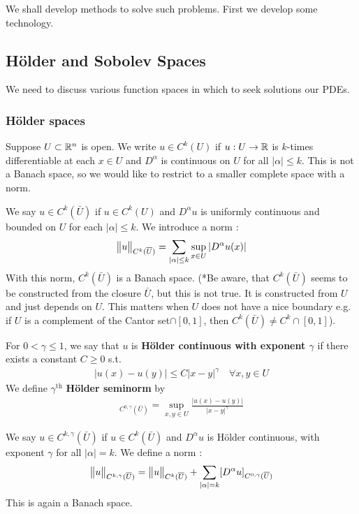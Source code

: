 \documentclass[12pt,a4paper]{report}
\begin{document}
We shall develop methods to solve such problems. First we develop some technology.

\subsection*{H\"{o}lder and Sobolev Spaces}

We need to discuss various function spaces in which to seek solutions our PDEs.

\subsubsection*{H\"{o}lder spaces}

Suppose $U\subset \mathbb{R}^n$ is open. We write $u\in C^k(U)$ if $u:U\rightarrow \mathbb{R}$ is $k$-times differentiable at each $x\in U$ and $D^{\alpha}$ is continuous on $U$ for all $|\alpha| \leq k$. This is not a Banach space, so we would like to restrict to a smaller complete space with a norm.

\quad We say $u\in C^k(\bar{U})$ if $u\in C^k (U)$ and $D^{\alpha}u$ is uniformly continuous and bounded on $U$ for each $|\alpha| \leq k$. We introduce a norm :
\begin{align*}
\bigl\lVert u\bigr\rVert_{C^k(\overline{U})} = \sum_{|\alpha|\leq k} \sup_{x\in U} |D^{\alpha}u(x)|
\end{align*}
With this norm, $C^k(\bar{U})$ is a Banach space. (*Be aware, that $C^k(\bar{U})$ seems to be constructed from the closure $\bar{U}$, but this is not true. It is constructed from $U$ and just depends on $U$. This matters when $U$ does not have a nice boundary e.g. if $U$ is a complement of the Cantor set$\cap [0,1]$, then $C^{k}(\bar{U})\neq C^{k} \cap [0,1]$).

\quad For $0< \gamma \leq 1$, we say that $u$ is \textbf{H\"{o}lder continuous with exponent $\gamma$} if there exists a constant $C\geq 0$ s.t.
\begin{align*}
|u(x)-u(y)|\leq C|x-y|^{\gamma} \quad \forall x,y \in U
\end{align*}
We define $\gamma^{\text{th}}$ \textbf{H\"{o}lder seminorm} by
\begin{align*}
[u]_{C^{0,\gamma}(\bar{U})} = \sup_{x,y\in U} \frac{|u(x)-u(y)|}{|x-y|^{\gamma}}
\end{align*}

\quad We say $u\in C^{k,\gamma}(\bar{U})$ if $u\in C^k(\bar{U})$ and $D^{\alpha}u$ is H\"{o}lder continuous, with exponent $\gamma$ for all $|\alpha|=k$. We define a norm : 
\begin{align*}
\bigl\lVert u\bigr\rVert_{C^{k,\gamma}(\overline{U})} = \bigl\lVert u\bigr\rVert_{C^k(\overline{U})} + \sum_{|\alpha|=k} [D^{\alpha} u]_{C^{0,\gamma}(\overline{U})}
\end{align*}
This is again a Banach space.
\end{document}
